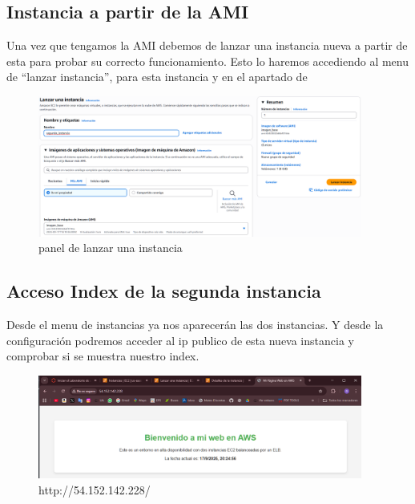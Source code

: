 \documentclass{article}
\begin{document}
\subsection{Instancia a partir de la AMI}
	Una vez que tengamos la AMI debemos de lanzar una instancia nueva a partir de esta para probar su correcto funcionamiento. Esto lo haremos accediendo al menu de ``lanzar instancia'', para esta instancia y en el apartado de 

	
	\begin{figure}[H]
	\centering
	\includegraphics[width=0.95\textwidth]{menu_lanzar_desde_imagen.png}
	\caption{panel de lanzar una instancia}
	\end{figure}

\newpage

\subsection{Acceso Index de la segunda instancia}

	Desde el menu de instancias ya nos aparecerán las dos instancias. Y desde la configuración podremos acceder al ip publico de esta nueva instancia y comprobar si se muestra nuestro index.

	\begin{figure}[H]
	\centering
	\includegraphics[width=0.95\textwidth]{index2.png}
	\caption{http://54.152.142.228/}
	\end{figure}



	 
\end{document}
